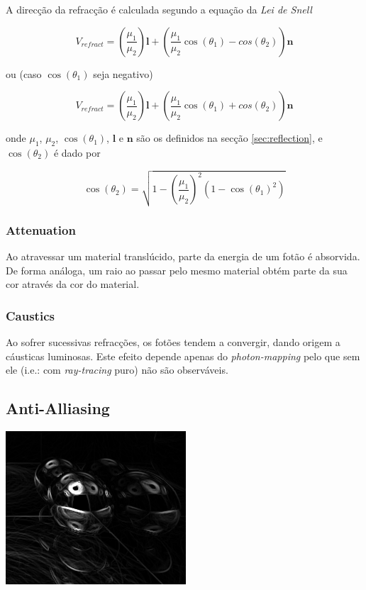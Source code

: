\documentclass[a4paper]{article}
\begin{document}
A direcção da refracção é calculada segundo a equação da \textit{Lei de Snell}

\begin{displaymath}
	V_{refract} = \left(\frac{\mu_{1}}{\mu_{2}}\right)\mathbf{l} + \left(\frac{\mu_{1}}{\mu_{2}} \cos(\theta_{1}) - cos(\theta_{2})\right)\mathbf{n}
\end{displaymath}

ou (caso $\cos(\theta_{1})$ seja negativo)

\begin{displaymath}
	V_{refract} = \left(\frac{\mu_{1}}{\mu_{2}}\right)\mathbf{l} + \left(\frac{\mu_{1}}{\mu_{2}} \cos(\theta_{1}) + cos(\theta_{2})\right)\mathbf{n}
\end{displaymath}

onde $\mu_{1}$, $\mu_{2}$, $\cos(\theta_{1})$, $\mathbf{l}$ e $\mathbf{n}$ são os definidos na secção \ref{sec:reflection}, e $\cos(\theta_{2})$ é dado por

\begin{displaymath}
	\cos(\theta_{2}) = \sqrt{1 - \left(\frac{\mu_{1}}{\mu_{2}}\right)^2 \left(1 - \cos\left(\theta_{1}\right)^2\right)}
\end{displaymath}

\subsubsection{Attenuation}
\indent \indent Ao atravessar um material translúcido, parte da energia de um fotão é absorvida. De forma análoga,
um raio ao passar pelo mesmo material obtém parte da sua cor através da cor do material.

\subsubsection{Caustics}
\indent \indent Ao sofrer sucessivas refracções, os fotões tendem a convergir, dando origem a cáusticas luminosas.
Este efeito depende apenas do \emph{photon-mapping} pelo que sem ele (i.e.: com \emph{ray-tracing} puro)
não são observáveis.

\cleardoublepage
\subsection{Anti-Alliasing}
\begin{center}
	\includegraphics[scale=0.50]{images/sobel.png}
	\label{fig:sobel}
\end{center}
\end{document}
